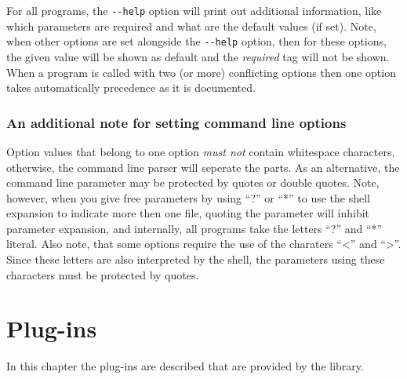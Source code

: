 \documentclass[english, 10pt, a4paper,headsepline,openany]{book}
\begin{document}
For all programs, the \texttt{-{}-help} option will print out additional information, like which parameters 
  are required and what are the default values (if set).
Note, when other options are set alongside the \texttt{-{}-help} option, then for these options, the given value 
  will be shown as default and the \emph{required} tag will not be shown.
When a program is called with two (or more) conflicting options then one option takes automatically 
  precedence as it is documented. 

\subsection*{An additional note for setting command line options}

Option values that belong to one option \emph{must not} contain whitespace characters, otherwise, 
  the command line parser will seperate the parts. 
As an alternative, the command line parameter may be protected by quotes or double quotes. 
Note, however, when you give free parameters by using ``?'' or ``*'' to use the shell expansion to indicate 
  more then one file, quoting the parameter will inhibit parameter expansion, and internally, all programs 
  take the letters ``?'' and ``*'' literal. 
Also note, that some options require the use of the charaters ``<'' and ``>''. 
Since these letters are also interpreted by the shell, the parameters using these characters must be 
  protected by quotes. 



\chapter{Plug-ins}
\label{ch:plugins}

In this chapter the plug-ins are described that are provided by the library.



\cleardoublepage{}

\end{document}
